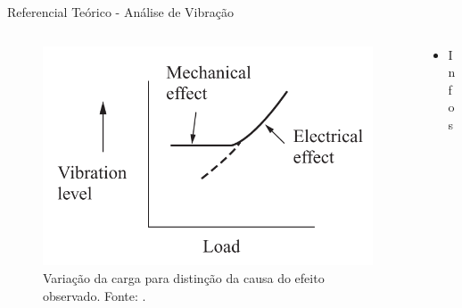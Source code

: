 \documentclass[aspectratio=169]{beamer}
\begin{document}
\begin{frame}{Referencial Teórico - Análise de Vibração}
	\begin{columns}
    	\begin{column}{0.50\textwidth}
			\begin{figure}[HT]
				\begin{center}
					\includegraphics[scale=.25]{../referencial/img/fault_effect_randall_p54.png}
					\caption{Variação da carga para distinção da causa do efeito observado. \newline
					Fonte: .} 
					\label{fig:fault_effect_randall_p54}
				\end{center}
			\end{figure}
     	\end{column}
		
		\begin{column}{0.5\textwidth}
			\begin{itemize}
				\item Infos
			\end{itemize}
	 	\end{column}
	 \end{columns}
\end{frame}

\end{document}
